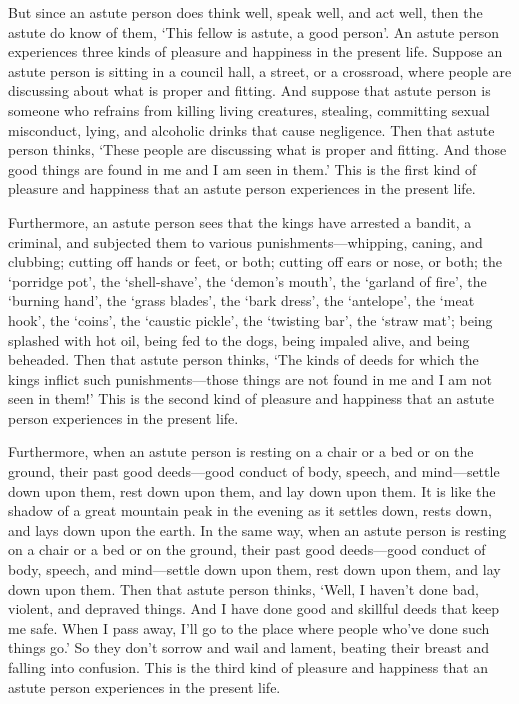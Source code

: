 \documentclass[12pt,openany]{book}%
\begin{document}
But since an astute person does think well, speak well, and act well, then the astute do know of them, ‘This fellow is astute, a good person’. An astute person experiences three kinds of pleasure and happiness in the present life. Suppose an astute person is sitting in a council hall, a street, or a crossroad, where people are discussing about what is proper and fitting. And suppose that astute person is someone who refrains from killing living creatures, stealing, committing sexual misconduct, lying, and alcoholic drinks that cause negligence. Then that astute person thinks, ‘These people are discussing what is proper and fitting. And those good things are found in me and I am seen in them.’ This is the first kind of pleasure and happiness that an astute person experiences in the present life. 

Furthermore, an astute person sees that the kings have arrested a bandit, a criminal, and subjected them to various punishments—whipping, caning, and clubbing; cutting off hands or feet, or both; cutting off ears or nose, or both; the ‘porridge pot’, the ‘shell-shave’, the ‘demon’s mouth’, the ‘garland of fire’, the ‘burning hand’, the ‘grass blades’, the ‘bark dress’, the ‘antelope’, the ‘meat hook’, the ‘coins’, the ‘caustic pickle’, the ‘twisting bar’, the ‘straw mat’; being splashed with hot oil, being fed to the dogs, being impaled alive, and being beheaded. Then that astute person thinks, ‘The kinds of deeds for which the kings inflict such punishments—those things are not found in me and I am not seen in them!’ This is the second kind of pleasure and happiness that an astute person experiences in the present life. 

Furthermore, when an astute person is resting on a chair or a bed or on the ground, their past good deeds—good conduct of body, speech, and mind—settle down upon them, rest down upon them, and lay down upon them. It is like the shadow of a great mountain peak in the evening as it settles down, rests down, and lays down upon the earth. In the same way, when an astute person is resting on a chair or a bed or on the ground, their past good deeds—good conduct of body, speech, and mind—settle down upon them, rest down upon them, and lay down upon them. Then that astute person thinks, ‘Well, I haven’t done bad, violent, and depraved things. And I have done good and skillful deeds that keep me safe. When I pass away, I’ll go to the place where people who’ve done such things go.’ So they don’t sorrow and wail and lament, beating their breast and falling into confusion. This is the third kind of pleasure and happiness that an astute person experiences in the present life. 
\end{document}

